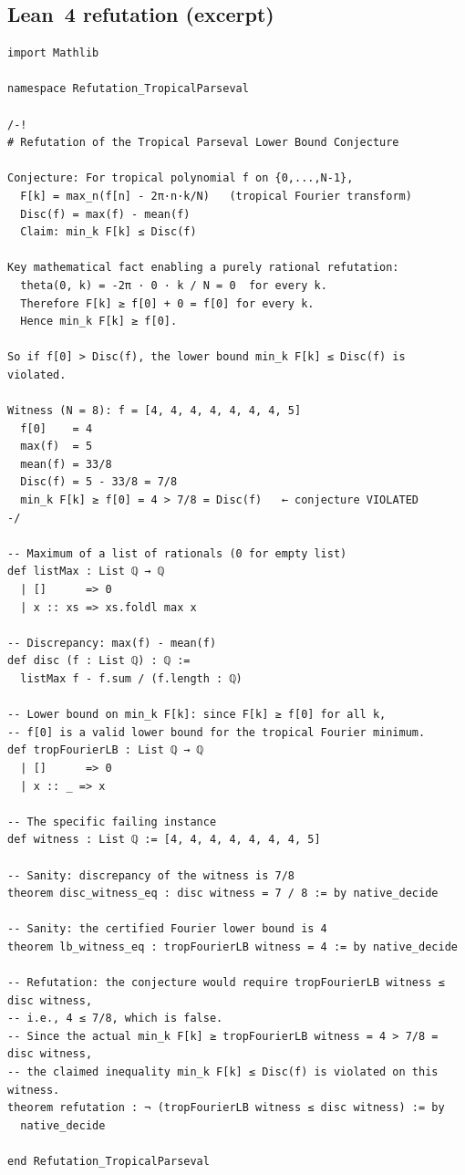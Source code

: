 \documentclass[11pt,a4paper]{article}
\begin{document}
\subsection*{Lean~4 refutation (excerpt)}
\begin{lstlisting}
import Mathlib

namespace Refutation_TropicalParseval

/-!
# Refutation of the Tropical Parseval Lower Bound Conjecture

Conjecture: For tropical polynomial f on {0,...,N-1},
  F[k] = max_n(f[n] - 2π·n·k/N)   (tropical Fourier transform)
  Disc(f) = max(f) - mean(f)
  Claim: min_k F[k] ≤ Disc(f)

Key mathematical fact enabling a purely rational refutation:
  theta(0, k) = -2π · 0 · k / N = 0  for every k.
  Therefore F[k] ≥ f[0] + 0 = f[0] for every k.
  Hence min_k F[k] ≥ f[0].

So if f[0] > Disc(f), the lower bound min_k F[k] ≤ Disc(f) is violated.

Witness (N = 8): f = [4, 4, 4, 4, 4, 4, 4, 5]
  f[0]    = 4
  max(f)  = 5
  mean(f) = 33/8
  Disc(f) = 5 - 33/8 = 7/8
  min_k F[k] ≥ f[0] = 4 > 7/8 = Disc(f)   ← conjecture VIOLATED
-/

-- Maximum of a list of rationals (0 for empty list)
def listMax : List ℚ → ℚ
  | []      => 0
  | x :: xs => xs.foldl max x

-- Discrepancy: max(f) - mean(f)
def disc (f : List ℚ) : ℚ :=
  listMax f - f.sum / (f.length : ℚ)

-- Lower bound on min_k F[k]: since F[k] ≥ f[0] for all k,
-- f[0] is a valid lower bound for the tropical Fourier minimum.
def tropFourierLB : List ℚ → ℚ
  | []      => 0
  | x :: _ => x

-- The specific failing instance
def witness : List ℚ := [4, 4, 4, 4, 4, 4, 4, 5]

-- Sanity: discrepancy of the witness is 7/8
theorem disc_witness_eq : disc witness = 7 / 8 := by native_decide

-- Sanity: the certified Fourier lower bound is 4
theorem lb_witness_eq : tropFourierLB witness = 4 := by native_decide

-- Refutation: the conjecture would require tropFourierLB witness ≤ disc witness,
-- i.e., 4 ≤ 7/8, which is false.
-- Since the actual min_k F[k] ≥ tropFourierLB witness = 4 > 7/8 = disc witness,
-- the claimed inequality min_k F[k] ≤ Disc(f) is violated on this witness.
theorem refutation : ¬ (tropFourierLB witness ≤ disc witness) := by
  native_decide

end Refutation_TropicalParseval
\end{lstlisting}
\end{document}
